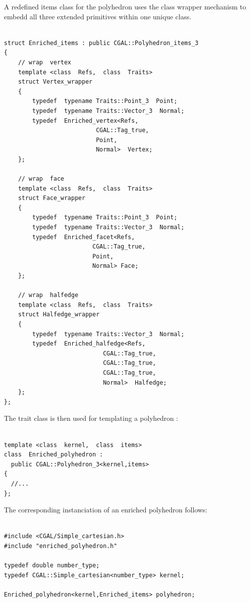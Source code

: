 A redefined items class for the polyhedron uses the class wrapper
mechanism to embedd all three extended primitives within one unique
class.

{ \scriptsize
\begin{verbatim}

struct Enriched_items : public CGAL::Polyhedron_items_3
{
    // wrap  vertex
    template <class  Refs,  class  Traits>
    struct Vertex_wrapper
    {
        typedef  typename Traits::Point_3  Point;
        typedef  typename Traits::Vector_3  Normal;
        typedef  Enriched_vertex<Refs,
                          CGAL::Tag_true,
                          Point,
                          Normal>  Vertex;
    };

    // wrap  face
    template <class  Refs,  class  Traits>
    struct Face_wrapper
    {
        typedef  typename Traits::Point_3  Point;
        typedef  typename Traits::Vector_3  Normal;
        typedef  Enriched_facet<Refs,
                         CGAL::Tag_true,
                         Point,
                         Normal> Face;
    };

    // wrap  halfedge
    template <class  Refs,  class  Traits>
    struct Halfedge_wrapper
    {
        typedef  typename Traits::Vector_3  Normal;
        typedef  Enriched_halfedge<Refs,
                            CGAL::Tag_true,
                            CGAL::Tag_true,
                            CGAL::Tag_true,
                            Normal>  Halfedge;
    };
};
\end{verbatim}}

The trait class is then used for templating a polyhedron
:

{ \scriptsize
\begin{verbatim}

template <class  kernel,  class  items>
class  Enriched_polyhedron :
  public CGAL::Polyhedron_3<kernel,items>
{
  //...
};
\end{verbatim}}

The corresponding instanciation of an enriched polyhedron follows:

{ \scriptsize
\begin{verbatim}

#include <CGAL/Simple_cartesian.h>
#include "enriched_polyhedron.h"

typedef double number_type;
typedef CGAL::Simple_cartesian<number_type> kernel;

Enriched_polyhedron<kernel,Enriched_items> polyhedron;

\end{verbatim}}


